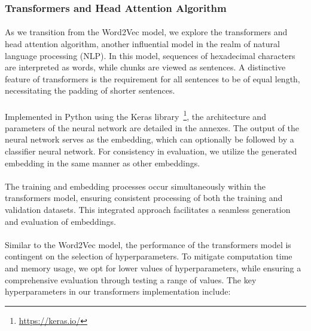     \subsubsection{Transformers and Head Attention Algorithm}
        \paragraph{}As we transition from the Word2Vec model, we explore the transformers and head attention algorithm, another influential model in the realm of natural language processing (NLP). In this model, sequences of hexadecimal characters are interpreted as words, while chunks are viewed as sentences. A distinctive feature of transformers is the requirement for all sentences to be of equal length, necessitating the padding of shorter sentences.
        
        \paragraph{}Implemented in Python using the Keras library~\footnote{\url{https://keras.io/}}, the architecture and parameters of the neural network are detailed in the annexes. The output of the neural network serves as the embedding, which can optionally be followed by a classifier neural network. For consistency in evaluation, we utilize the generated embedding in the same manner as other embeddings.
        
        \paragraph{}The training and embedding processes occur simultaneously within the transformers model, ensuring consistent processing of both the training and validation datasets. This integrated approach facilitates a seamless generation and evaluation of embeddings.
        
        \paragraph{}Similar to the Word2Vec model, the performance of the transformers model is contingent on the selection of hyperparameters. To mitigate computation time and memory usage, we opt for lower values of hyperparameters, while ensuring a comprehensive evaluation through testing a range of values. The key hyperparameters in our transformers implementation include:
        
